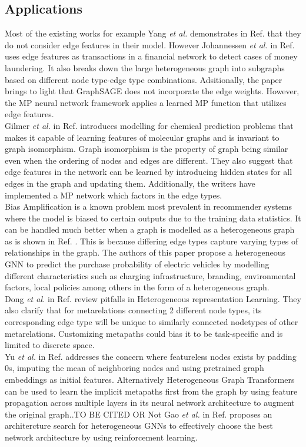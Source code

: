 \documentclass{report} %
\begin{document}
\subsection{Applications}\label{subsec:HGNN Applications}
Most of the existing works for example Yang \textit{et al.} demonstrates in Ref. \cite{HGNN-2020} that they do not consider edge features in their model. 
However Johannessen \textit{et al.} in Ref. \cite{ML HGNN-2023} uses edge features as transactions in a financial network to detect cases of money laundering.
It also breaks down the large heterogeneous graph into subgraphs based on different node type-edge type combinations. 
Adsitionally, the paper brings to light that GraphSAGE does not incorporate the edge weights.
However, the \ac{MP} neural network framework applies a learned \ac{MP} function that utilizes edge features.\\
Gilmer \textit{et al.} in Ref. \cite{QC-MP-2017} introduces modelling for chemical prediction problems that makes it capable of learning features of molecular graphs 
and is invariant to graph isomorphism. Graph isomorphism is the property of graph being similar even when the ordering of nodes and edges are different.
They also suggest that edge features in the network can be learned by introducing hidden states for all edges in the graph and updating them.
Additionally, the writers have implemented a \ac{MP} network which factors in the edge types.\\
Bias Amplification is a known problem most prevalent in recommender systems where the model is biased to certain outputs due to the training data statistics.
It can be handled much better when a graph is modelled as a heterogeneous graph as is shown in Ref. \cite{EV HGNN-2023}. This is because differing 
edge types capture varying types of relationships in the graph. The authors of this paper propose a heterogeneous \ac{GNN} to predict the purchase probability of 
electric vehicles by modelling different characteristics such as charging infrastructure, branding, environmental factors, local policies among others in the form of a 
heterogeneous graph.\\
Dong \textit{et al.} in Ref. \cite{HNRL-2020} review pitfalls in Heterogeneous representation Learning. They also clarify that for metarelations connecting 2 different 
node types, its corresponding edge type will be unique to similarly connected nodetypes of other metarelations. Customizing metapaths could bias it to be task-specific 
and is limited to discrete space.\\
Yu \textit{et al.} in Ref. \cite{SHGNN-2020} addresses the concern where featureless nodes exists by padding 0s, imputing the mean of neighboring nodes and using pretrained graph 
embeddings as initial features. 
Alternatively Heterogeneous Graph Transformers can be used to learn the implicit metapaths first from the graph by using feature propagation across multiple layers in its 
neural network architecture to augment the original graph..TO BE CITED OR Not
Gao \textit{et al.} in Ref. \cite{HGNNAS-2021} proposes an architercture search for heterogeneous \ac{GNN}s to effectively choose the best network architecture by using 
reinforcement learning. 
\end{document}
